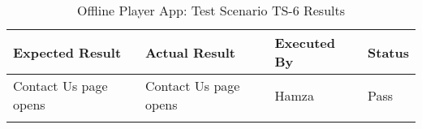 \begin{longtable}{|p{4cm}|p{4cm}|p{2cm}|p{2cm}|}
\hline
\textbf{Expected Result} & \textbf{Actual Result} & \textbf{Executed By} & \textbf{Status}\\
\hline
Contact Us page opens &
Contact Us page opens &
Hamza &
Pass \\
\hline

\caption{Offline Player App: Test Scenario TS-6 Results}
\end{longtable}


























